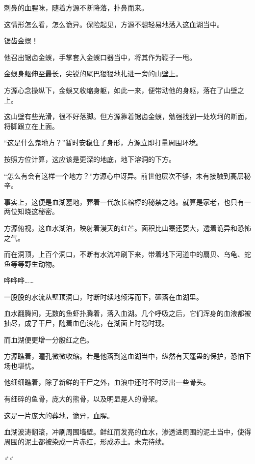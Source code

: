 \begin{this_body}
刺鼻的血腥味，随着方源不断降落，扑鼻而来。

这情形怎么看，怎么诡异。保险起见，方源不想轻易地落入这血湖当中。

锯齿金蜈！

他召出锯齿金蜈，手掌套入金蜈口器当中，将其作为鞭子一甩。

金蜈身躯伸至最长，尖锐的尾巴狠狠地扎进一旁的山壁上。

方源心念操纵下，金蜈又收缩身躯，如此一来，便带动他的身躯，落在了山壁之上。

这山壁有些光滑，很不好落脚。但方源靠着锯齿金蜈，勉强找到一处坎坷的断面，将脚跟立在上面。

“这是什么鬼地方？”暂时安稳住了身形，方源立即打量周围环境。

按照方位计算，这应该是更深的地底，地下溶洞的下方。

“怎么有会有这样一个地方？”方源心中讶异。前世他层次不够，未有接触到高层秘辛。

事实上，这便是血湖墓地，葬着一代族长棺椁的秘禁之地。就算是家老，也只有一两位知晓这秘密。

方源俯视，这血水湖泊，映射着漫天的红芒。面积比山寨还要大，透着诡异和恐怖之气。

而在洞顶，上百个洞口，不断有水流冲刷下来，带着地下河道中的扇贝、乌龟、蛇鱼等等野生动物。

哗哗哗……

一股股的水流从壁顶洞口，时断时续地倾泻而下，砸落在血湖里。

血水翻腾间，无数的鱼虾扑腾着，落入血湖。几个呼吸之后，它们浑身的血液都被抽尽，成了干尸，随着血色浪花，在湖面上时隐时现。

而血湖便更增一分殷红之色。

方源瞧着，瞳孔微微收缩。若是他落到这血湖当中，纵然有天蓬蛊的保护，恐怕下场也堪忧。

他细细瞧着，除了新鲜的干尸之外，血浪中还时不时泛出一些骨头。

有细碎的鱼骨，庞大的熊骨，以及明显是人的骨架。

这是一片庞大的葬地，诡异，血腥。

血湖波涛翻滚，冲刷周围墙壁。鲜红而发亮的血水，渗透进周围的泥土当中，使得周围的泥土都被染成一片赤红，形成赤土。未完待续。

♂♂

\end{this_body}


